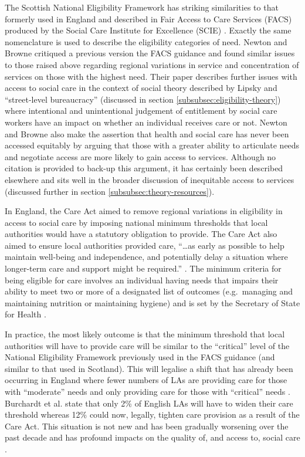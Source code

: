 \documentclass[12pt,]{report}
\begin{document}
The Scottish National Eligibility Framework has striking similarities to
that formerly used in England and described in Fair Access to Care
Services (FACS) produced by the Social Care Institute for Excellence
(SCIE) \citeyearpar{RN138}. Exactly the same nomenclature is used to
describe the eligibility categories of need. Newton and Browne
\citeyearpar{RN163} critiqued a previous version the FACS guidance and
found similar issues to those raised above regarding regional variations
in service and concentration of services on those with the highest need.
Their paper describes further issues with access to social care in the
context of social theory described by Lipsky \citeyearpar{RN174} and
``street-level bureaucracy'' (discussed in section
\ref{subsubsec:eligibility-theory}) where intentional and unintentional
judgement of entitlement by social care workers have an impact on
whether an individual receives care or not. Newton and Browne
\citeyearpar{RN163} also make the assertion that health and social care
has never been accessed equitably by arguing that those with a greater
ability to articulate needs and negotiate access are more likely to gain
access to services. Although no citation is provided to back-up this
argument, it has certainly been described elsewhere \citep{RN118} and
sits well in the broader discussion of inequitable access to services
\citep{RN116, RN175, RN120} (discussed further in section
\ref{subsubsec:theory-resources}).

In England, the Care Act \citeyearpar{RN176} aimed to remove regional
variations in eligibility in access to social care by imposing national
minimum thresholds that local authorities would have a statutory
obligation to provide. The Care Act also aimed to ensure local
authorities provided care, ``\ldots{}as early as possible to help
maintain well-being and independence, and potentially delay a situation
where longer-term care and support might be required.''
\citep[pp.2]{RN169}. The minimum criteria for being eligible for care
involves an individual having needs that impairs their ability to meet
two or more of a designated list of outcomes (e.g.~managing and
maintaining nutrition or maintaining hygiene) \citep{RN169} and is set
by the Secretary of State for Health \citep{RN177}.

In practice, the most likely outcome is that the minimum threshold that
local authorities will have to provide care will be similar to the
``critical'' level of the National Eligibility Framework previously used
in the FACS guidance \citep{RN173, RN177} (and similar to that used in
Scotland). This will legalise a shift that has already been occurring in
England where fewer numbers of LAs are providing care for those with
``moderate'' needs and only providing care for those with ``critical''
needs \citep{RN173, RN177}. Burchardt et al. \citeyearpar{RN173} state
that only 2\% of English LAs will have to widen their care threshold
whereas 12\% could now, legally, tighten care provision as a result of
the Care Act. This situation is not new and has been gradually worsening
over the past decade and has profound impacts on the quality of, and
access to, social care \citep{RN374}.
\end{document}
